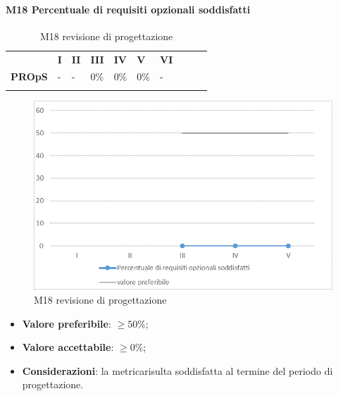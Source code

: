 \paragraph{M18 Percentuale di requisiti opzionali soddisfatti} \mbox{}
\begin{longtable}[H!] {						
		>{}p{50mm}  		
		>{}p{8mm}
		>{}p{8mm}		
		>{}p{8mm}		
		>{}p{8mm}		
		>{}p{8mm}		
		>{}p{8mm}
		>{}p{8mm}
		>{}p{8mm}
		>{}p{8mm}
	}
	\rowcolor{gray!50}
	\textbf{} & \textbf{I} & \textbf{II} & \textbf{III} & \textbf{IV} & \textbf{V} & \textbf{VI} \TBstrut \\ [2mm]
	\textbf{PROpS} & - & - & 0\% & 0\% & 0\% & - \TBstrut \\ [2mm]
	\rowcolor{white}
	\caption{M18 revisione di progettazione\glo}
\end{longtable}
\begin{figure}[H] 	
\includegraphics[width=\linewidth]{./img/grafici/RP15.png}	
\caption{M18 revisione di progettazione\glo}	
\end{figure}
\begin{itemize}
	\item \textbf{Valore preferibile}: $\ge50\%$;
	\item \textbf{Valore accettabile}: $\ge0\%$;
	\item \textbf{Considerazioni}: la metrica\glosp risulta soddisfatta al termine del periodo di progettazione\glo.
\end{itemize}
